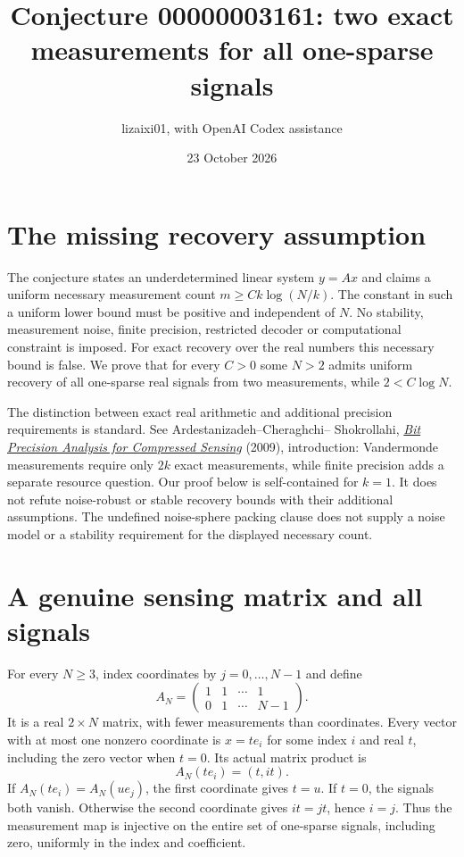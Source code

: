 \documentclass[11pt]{article}
\title{Conjecture 00000003161: two exact measurements for all one-sparse signals}
\author{lizaixi01, with OpenAI Codex assistance}
\date{23 October 2026}
\begin{document}
\maketitle
\section{The missing recovery assumption}
The conjecture states an underdetermined linear system $y=Ax$ and
claims a uniform necessary measurement count
$m\ge Ck\log(N/k)$. The constant in such a uniform lower bound must
be positive and independent of $N$. No stability, measurement noise,
finite precision, restricted decoder or computational constraint is
imposed. For exact recovery over the real numbers this necessary
bound is false. We prove that for every $C>0$ some $N>2$ admits
uniform recovery of all one-sparse real signals from two measurements,
while $2<C\log N$.

The distinction between exact real arithmetic and additional
precision requirements is standard. See Ardestanizadeh--Cheraghchi--
Shokrollahi, \href{https://arxiv.org/abs/0901.2147}
{\emph{Bit Precision Analysis for Compressed Sensing}} (2009),
introduction: Vandermonde measurements require only $2k$ exact
measurements, while finite precision adds a separate resource question.
Our proof below is self-contained for $k=1$. It does not refute
noise-robust or stable recovery bounds with their additional assumptions.
The undefined noise-sphere packing clause does not supply a noise model
or a stability requirement for the displayed necessary count.

\section{A genuine sensing matrix and all signals}
For every $N\ge3$, index coordinates by $j=0,\ldots,N-1$ and define
\[
 A_N=\begin{pmatrix}1&1&\cdots&1\\0&1&\cdots&N-1\end{pmatrix}.
\]
It is a real $2\times N$ matrix, with fewer measurements than coordinates.
Every vector with at most one nonzero coordinate is $x=t e_i$ for
some index $i$ and real $t$, including the zero vector when $t=0$.
Its actual matrix product is
\[
 A_N(te_i)=(t,it).
\]
If $A_N(te_i)=A_N(ue_j)$, the first coordinate gives $t=u$.
If $t=0$, the signals both vanish. Otherwise the second coordinate
gives $it=jt$, hence $i=j$. Thus the measurement map is injective
on the entire set of one-sparse signals, including zero, uniformly
in the index and coefficient.
\end{document}
